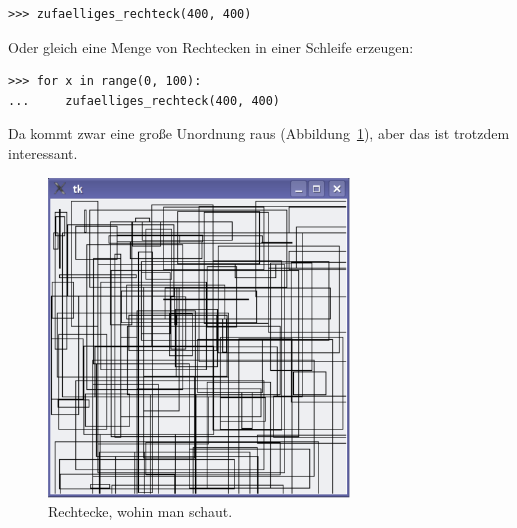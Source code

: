 \begin{Verbatim}[frame=single]
>>> zufaelliges_rechteck(400, 400)
\end{Verbatim}

\noindent
Oder gleich eine Menge von Rechtecken in einer Schleife erzeugen:

\begin{Verbatim}[frame=single]
>>> for x in range(0, 100):
...     zufaelliges_rechteck(400, 400)
\end{Verbatim}

\noindent
Da kommt zwar eine große Unordnung raus (Abbildung~\ref{fig34}), aber das ist trotzdem interessant.

\begin{figure}
\begin{center}
\includegraphics[width=80mm]{images/figure34}
\end{center}
\caption{Rechtecke, wohin man schaut.}\label{fig34}
\end{figure}

